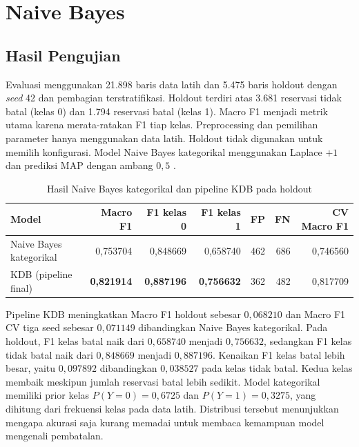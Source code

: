 \section{Naive Bayes}

\subsection{Hasil Pengujian}

Evaluasi menggunakan 21.898 baris data latih dan 5.475 baris holdout dengan
\textit{seed} 42 dan pembagian terstratifikasi. Holdout terdiri atas 3.681
reservasi tidak batal (kelas 0) dan 1.794 reservasi batal (kelas 1).
Macro F1 menjadi metrik utama karena merata-ratakan F1 tiap kelas.
Preprocessing dan pemilihan parameter hanya menggunakan data latih.
Holdout tidak digunakan untuk memilih konfigurasi. Model Naive Bayes
kategorikal menggunakan Laplace $+1$ dan prediksi MAP dengan ambang $0{,}5$
\cite{maulidevi2024bayesnet}.

\begin{table}[H]
    \centering
    \caption{Hasil Naive Bayes kategorikal dan pipeline KDB pada holdout}
    \label{tab:nb-results}
    \begin{tabular}{lrrrrrr}
        \hline
        Model                   & Macro F1          & F1 kelas 0        & F1 kelas 1        & FP  & FN  & CV Macro F1 \\
        \hline
        Naive Bayes kategorikal & 0,753704          & 0,848669          & 0,658740          & 462 & 686 & 0,746560    \\
        KDB (pipeline final)    & \textbf{0,821914} & \textbf{0,887196} & \textbf{0,756632} & 362 & 482 & 0,817709    \\
        \hline
    \end{tabular}
\end{table}

Pipeline KDB meningkatkan Macro F1 holdout sebesar $0{,}068210$ dan Macro F1
CV tiga seed sebesar $0{,}071149$ dibandingkan Naive Bayes kategorikal. Pada
holdout, F1 kelas batal naik dari $0{,}658740$ menjadi $0{,}756632$,
sedangkan F1 kelas tidak batal naik dari $0{,}848669$ menjadi $0{,}887196$.
Kenaikan F1 kelas batal lebih besar, yaitu $0{,}097892$ dibandingkan
$0{,}038527$ pada kelas tidak batal. Kedua kelas membaik meskipun jumlah
reservasi batal lebih sedikit. Model kategorikal memiliki prior kelas
$P(Y=0)=0{,}6725$ dan $P(Y=1)=0{,}3275$, yang dihitung dari frekuensi kelas
pada data latih. Distribusi tersebut menunjukkan mengapa akurasi saja
kurang memadai untuk membaca kemampuan model mengenali pembatalan.

